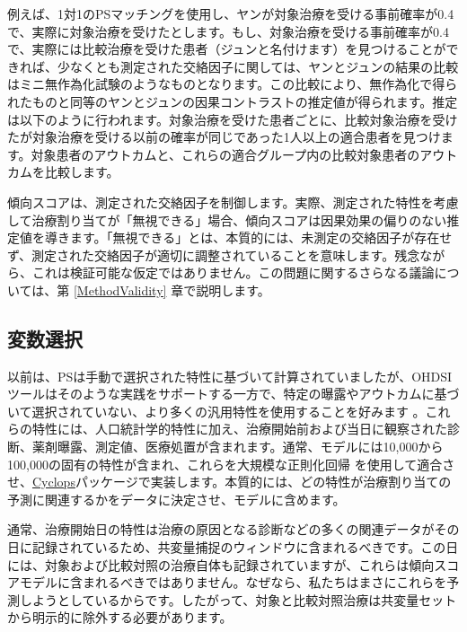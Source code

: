 \documentclass[
  11pt]{book}
\makeatletter
\newenvironment{kframe}{%
\medskip{}
\setlength{\fboxsep}{.8em}
 \def\at@end@of@kframe{}%
 \ifinner\ifhmode%
  \def\at@end@of@kframe{\end{minipage}}%
  \begin{minipage}{\columnwidth}%
 \fi\fi%
 \def\FrameCommand##1{\hskip\@totalleftmargin \hskip-\fboxsep
 \colorbox{myShadeColor}{##1}\hskip-\fboxsep
     \hskip-\linewidth \hskip-\@totalleftmargin \hskip\columnwidth}%
 \MakeFramed {\advance\hsize-\width
   \@totalleftmargin\z@ \linewidth\hsize
   \@setminipage}}%
 {\par\unskip\endMakeFramed%
 \at@end@of@kframe}
\newenvironment{rmdblock}[1]
  {
  \begin{itemize}
  \renewcommand{\labelitemi}{
    \raisebox{-.7\height}[0pt][0pt]{
      {\setkeys{Gin}{width=3em,keepaspectratio}\texttt{[image: images/\#1]}}
    }
  }
  \setlength{\fboxsep}{1em}
  \begin{kframe}
  \item
  }
  {
  \end{kframe}
  \end{itemize}
  }
\newenvironment{rmdimportant}
  {\begin{rmdblock}{important}}
  {\end{rmdblock}}
\theoremstyle{definition}
\theoremstyle{definition}
\theoremstyle{definition}
\theoremstyle{definition}
\theoremstyle{remark}
\makeatother
\begin{document}
例えば、1対1のPSマッチングを使用し、ヤンが対象治療を受ける事前確率が0.4で、実際に対象治療を受けたとします。もし、対象治療を受ける事前確率が0.4で、実際には比較治療を受けた患者（ジュンと名付けます）を見つけることができれば、少なくとも測定された交絡因子に関しては、ヤンとジュンの結果の比較はミニ無作為化試験のようなものとなります。この比較により、無作為化で得られたものと同等のヤンとジュンの因果コントラストの推定値が得られます。推定は以下のように行われます。対象治療を受けた患者ごとに、比較対象治療を受けたが対象治療を受ける以前の確率が同じであった1人以上の適合患者を見つけます。対象患者のアウトカムと、これらの適合グループ内の比較対象患者のアウトカムを比較します。

傾向スコアは、測定された交絡因子を制御します。実際、測定された特性を考慮して治療割り当てが「無視できる」場合、傾向スコアは因果効果の偏りのない推定値を導きます。「無視できる」とは、本質的には、未測定の交絡因子が存在せず、測定された交絡因子が適切に調整されていることを意味します。残念ながら、これは検証可能な仮定ではありません。この問題に関するさらなる議論については、第 \ref{MethodValidity} 章で説明します。 

\subsection{変数選択}\label{VariableSelection}

以前は、PSは手動で選択された特性に基づいて計算されていましたが、OHDSIツールはそのような実践をサポートする一方で、特定の曝露やアウトカムに基づいて選択されていない、より多くの汎用特性を使用することを好みます \citep{tian_2018} 。これらの特性には、人口統計学的特性に加え、治療開始前および当日に観察された診断、薬剤曝露、測定値、医療処置が含まれます。通常、モデルには10,000から100,000の固有の特性が含まれ、これらを大規模な正則化回帰 \citep{suchard_2013} を使用して適合させ、\href{https://ohdsi.github.io/Cyclops/}{Cyclops}パッケージで実装します。本質的には、どの特性が治療割り当ての予測に関連するかをデータに決定させ、モデルに含めます。

\begin{rmdimportant}
通常、治療開始日の特性は治療の原因となる診断などの多くの関連データがその日に記録されているため、共変量捕捉のウィンドウに含まれるべきです。この日には、対象および比較対照の治療自体も記録されていますが、これらは傾向スコアモデルに含まれるべきではありません。なぜなら、私たちはまさにこれらを予測しようとしているからです。したがって、対象と比較対照治療は共変量セットから明示的に除外する必要があります。
\end{rmdimportant}
\end{document}
